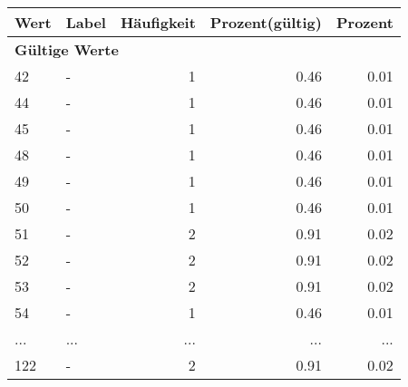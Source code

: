      \begin{longtable}{lXrrr}
     \toprule
     \textbf{Wert} & \textbf{Label} & \textbf{Häufigkeit} & \textbf{Prozent(gültig)} & \textbf{Prozent} \\
     \endhead
     \midrule
     \multicolumn{5}{l}{\textbf{Gültige Werte}}\\
        42 & \multicolumn{1}{X}{-} & %
          \num{1} &
          \num[round-mode=places,round-precision=2]{0,46} &
          \num[round-mode=places,round-precision=2]{0,01} \\
        44 & \multicolumn{1}{X}{-} & %
          \num{1} &
          \num[round-mode=places,round-precision=2]{0,46} &
          \num[round-mode=places,round-precision=2]{0,01} \\
        45 & \multicolumn{1}{X}{-} & %
          \num{1} &
          \num[round-mode=places,round-precision=2]{0,46} &
          \num[round-mode=places,round-precision=2]{0,01} \\
        48 & \multicolumn{1}{X}{-} & %
          \num{1} &
          \num[round-mode=places,round-precision=2]{0,46} &
          \num[round-mode=places,round-precision=2]{0,01} \\
        49 & \multicolumn{1}{X}{-} & %
          \num{1} &
          \num[round-mode=places,round-precision=2]{0,46} &
          \num[round-mode=places,round-precision=2]{0,01} \\
        50 & \multicolumn{1}{X}{-} & %
          \num{1} &
          \num[round-mode=places,round-precision=2]{0,46} &
          \num[round-mode=places,round-precision=2]{0,01} \\
        51 & \multicolumn{1}{X}{-} & %
          \num{2} &
          \num[round-mode=places,round-precision=2]{0,91} &
          \num[round-mode=places,round-precision=2]{0,02} \\
        52 & \multicolumn{1}{X}{-} & %
          \num{2} &
          \num[round-mode=places,round-precision=2]{0,91} &
          \num[round-mode=places,round-precision=2]{0,02} \\
        53 & \multicolumn{1}{X}{-} & %
          \num{2} &
          \num[round-mode=places,round-precision=2]{0,91} &
          \num[round-mode=places,round-precision=2]{0,02} \\
        54 & \multicolumn{1}{X}{-} & %
          \num{1} &
          \num[round-mode=places,round-precision=2]{0,46} &
          \num[round-mode=places,round-precision=2]{0,01} \\
       ... & ... & ... & ... & ... \\
        122 & \multicolumn{1}{X}{-} & %
          \num{2} &
          \num[round-mode=places,round-precision=2]{0,91} &
          \num[round-mode=places,round-precision=2]{0,02} \\


\end{longtable}
